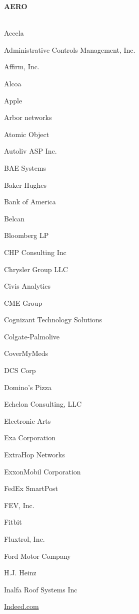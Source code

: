 \documentclass[twoside]{article}
\begin{document}
    \begin{center}\begin{multicols}{5}
    {\fontsize{14}{16}\selectfont \bf AERO}\\
        \vspace{-1em}
        ~\hrulefill~
        \vspace{-.9em}
        \begin{FlushLeft}
        \begin{compactitem}
        \item Accela
\item Administrative Controls Management, Inc.
\item Affirm, Inc.
\item Alcoa
\item Apple
\item Arbor networks
\item Atomic Object
\item Autoliv ASP Inc.
\item BAE Systems
\item Baker Hughes
\item Bank of America
\item Belcan
\item Bloomberg LP
\item CHP Consulting Inc
\item Chrysler Group LLC
\item Civis Analytics
\item CME Group
\item Cognizant Technology Solutions
\item Colgate-Palmolive
\item CoverMyMeds
\item DCS Corp
\item Domino's Pizza
\item Echelon Consulting, LLC
\item Electronic Arts
\item Exa Corporation
\item ExtraHop Networks
\item ExxonMobil Corporation
\item FedEx SmartPost
\item FEV, Inc.
\item Fitbit
\item Fluxtrol, Inc.
\item Ford Motor Company
\item H.J. Heinz
\item Inalfa Roof Systems Inc
\item \url{Indeed.com}

\end{compactitem}
\end{FlushLeft}
\end{multicols}
\end{center}
\end{document}
